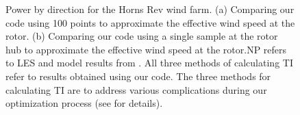 \documentclass[conf]{new-aiaa}
\begin{document}
\begin{figure}[htbp!]
	\centering
	\caption{Power by direction for the Horns Rev wind farm. (a) Comparing our code using 100 points to approximate the effective wind speed at the rotor. (b) Comparing our code using a single sample at the rotor hub to approximate the effective wind speed at the rotor.NP refers to LES and model results from \cite{niayifar2016}. All three methods of calculating TI refer to results obtained using our code. The three methods for calculating TI are to address various complications during our optimization process (see  for details).}
	
	\label{fig:power_direction}
\end{figure}
\end{document}
